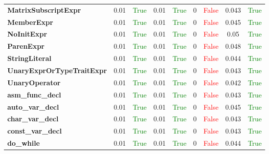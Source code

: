 \documentclass{article}
\begin{document}
\begin{xltabular}{\textwidth}{lcccccccc}
\textbf{{\fontsize{10}{12}\selectfont MatrixSubscriptExpr}}& 0.01&\textcolor{green}{True}& 0.01&\textcolor{green}{True}& 0&\textcolor{red}{False}& 0.043&\textcolor{green}{True} \\[0.5ex]
\textbf{{\fontsize{10}{12}\selectfont MemberExpr}}& 0.01&\textcolor{green}{True}& 0.01&\textcolor{green}{True}& 0&\textcolor{red}{False}& 0.045&\textcolor{green}{True} \\[0.5ex]
\textbf{{\fontsize{10}{12}\selectfont NoInitExpr}}& 0.01&\textcolor{green}{True}& 0.01&\textcolor{green}{True}& 0&\textcolor{red}{False}& 0.05&\textcolor{green}{True} \\[0.5ex]
\textbf{{\fontsize{10}{12}\selectfont ParenExpr}}& 0.01&\textcolor{green}{True}& 0.01&\textcolor{green}{True}& 0&\textcolor{red}{False}& 0.048&\textcolor{green}{True} \\[0.5ex]
\textbf{{\fontsize{10}{12}\selectfont StringLiteral}}& 0.01&\textcolor{green}{True}& 0.01&\textcolor{green}{True}& 0&\textcolor{red}{False}& 0.044&\textcolor{green}{True} \\[0.5ex]
\textbf{{\fontsize{10}{12}\selectfont UnaryExprOrTypeTraitExpr}}& 0.01&\textcolor{green}{True}& 0.01&\textcolor{green}{True}& 0&\textcolor{red}{False}& 0.043&\textcolor{green}{True} \\[0.5ex]
\textbf{{\fontsize{10}{12}\selectfont UnaryOperator}}& 0.01&\textcolor{green}{True}& 0.01&\textcolor{green}{True}& 0&\textcolor{red}{False}& 0.042&\textcolor{green}{True} \\[0.5ex]
\textbf{{\fontsize{10}{12}\selectfont asm\_func\_decl}}& 0.01&\textcolor{green}{True}& 0.01&\textcolor{green}{True}& 0&\textcolor{red}{False}& 0.043&\textcolor{green}{True} \\[0.5ex]
\textbf{{\fontsize{10}{12}\selectfont auto\_var\_decl}}& 0.01&\textcolor{green}{True}& 0.01&\textcolor{green}{True}& 0&\textcolor{red}{False}& 0.045&\textcolor{green}{True} \\[0.5ex]
\textbf{{\fontsize{10}{12}\selectfont char\_var\_decl}}& 0.01&\textcolor{green}{True}& 0.01&\textcolor{green}{True}& 0&\textcolor{red}{False}& 0.043&\textcolor{green}{True} \\[0.5ex]
\textbf{{\fontsize{10}{12}\selectfont const\_var\_decl}}& 0.01&\textcolor{green}{True}& 0.01&\textcolor{green}{True}& 0&\textcolor{red}{False}& 0.043&\textcolor{green}{True} \\[0.5ex]
\textbf{{\fontsize{10}{12}\selectfont do\_while}}& 0.01&\textcolor{green}{True}& 0.01&\textcolor{green}{True}& 0&\textcolor{red}{False}& 0.044&\textcolor{green}{True} \\[0.5ex]

\end{xltabular}
\end{document}
